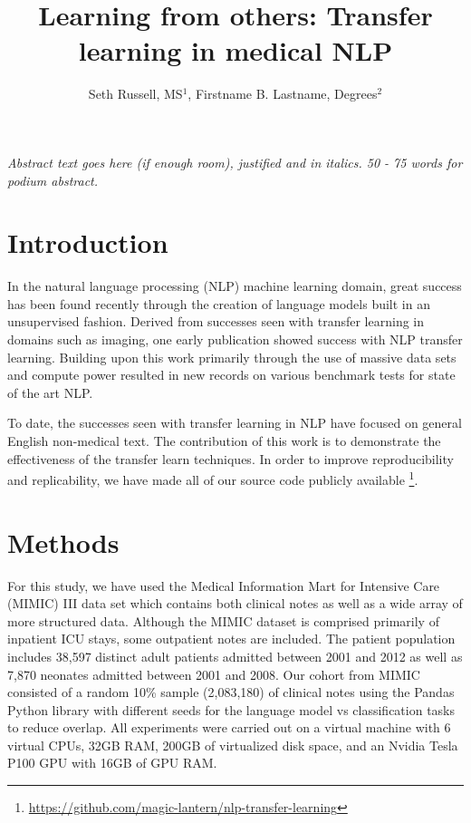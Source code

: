 \documentclass{amia}
\begin{document}
\title{Learning from others: Transfer learning in medical NLP}

\author{Seth Russell, MS$^{1}$, Firstname B. Lastname, Degrees$^{2}$}


\maketitle


\textit{Abstract text goes here (if enough room),  justified and in italics.  50 - 75 words for podium abstract.}

\section*{Introduction}

In the natural language processing (NLP) machine learning domain, great success has been found recently through the creation of language models built in an unsupervised fashion. Derived from successes seen with transfer learning in domains such as imaging, one early publication \cite{howard_universal_2018} showed success with NLP transfer learning. Building upon this work primarily through the use of massive data sets and compute power \cite{radford_improving_2018,radford_language_2019} resulted in new records on various benchmark tests for state of the art NLP.

To date, the successes seen with transfer learning in NLP have focused on general English non-medical text. The contribution of this work is to demonstrate the effectiveness of the transfer learn techniques. In order to improve reproducibility and replicability, we have made all of our source code publicly available \footnote{\url{https://github.com/magic-lantern/nlp-transfer-learning}}.

\section*{Methods}

For this study, we have used the Medical Information Mart for Intensive Care (MIMIC) III \cite{johnson_mimic-iii_2016} data set which contains both clinical notes as well as a wide array of more structured data. Although the MIMIC dataset is comprised primarily of inpatient ICU stays, some outpatient notes are included. The patient population includes 38,597 distinct adult patients admitted between 2001 and 2012 as well as 7,870 neonates admitted between 2001 and 2008. Our cohort from MIMIC consisted of a random 10\% sample (2,083,180) of clinical notes using the Pandas Python library \cite{mckinney-proc-scipy-2010} with different seeds for the language model vs classification tasks to reduce overlap. All experiments were carried out on a virtual machine with 6 virtual CPUs, 32GB RAM, 200GB of virtualized disk space, and an Nvidia Tesla P100 GPU with 16GB of GPU RAM. 
\end{document}
